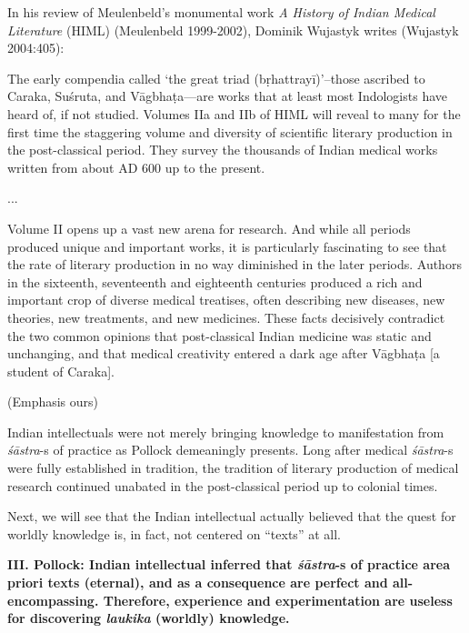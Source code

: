 In his review of Meulenbeld's monumental work {\sl A History of Indian Medical Literature} (HIML) (Meulenbeld 1999-2002), Dominik Wujastyk writes (Wujastyk 2004:405):
\begin{myquote}
The early compendia called `the great triad (bṛhattrayī)'--those ascribed to Caraka, Suśruta, and Vāgbhaṭa---are works that at least most Indologists have heard of, if not studied. Volumes IIa and IIb of HIML will reveal to many for the first time the staggering volume and diversity of scientific literary production in the post-classical period. They survey the thousands of Indian medical works written from about AD 600 up to the present. 

...

Volume II opens up a vast new arena for research. And while all periods produced unique and important works, it is particularly fascinating to see that the rate of literary production in no way diminished in the later periods.  Authors in the sixteenth, seventeenth and eighteenth centuries produced a rich and important crop of diverse medical treatises, often describing new diseases, new theories, new treatments, and new medicines. These facts decisively contradict the two common opinions that post-classical Indian medicine was static and unchanging, and that medical creativity entered a dark age after Vāgbhaṭa [a student of Caraka].

(Emphasis ours)
\end{myquote}

Indian intellectuals were not merely bringing knowledge to manifestation from {\sl śāstra}-s of practice as Pollock demeaningly presents.  Long after medical {\sl śāstra}-s were fully established in tradition, the tradition of literary production of medical research continued unabated in the post-classical period up to colonial times.

Next, we will see that the Indian intellectual actually believed that the quest for worldly knowledge is, in fact, not centered on ``texts'' at all.

{\bf III. Pollock: Indian intellectual inferred that {{\sl\bfseries śāstra}\relax}-s of practice area priori texts (eternal), and as a consequence are perfect and all-encompassing.  Therefore, experience and experimentation are useless for discovering {{\sl\bfseries laukika}\relax} (worldly) knowledge.}

